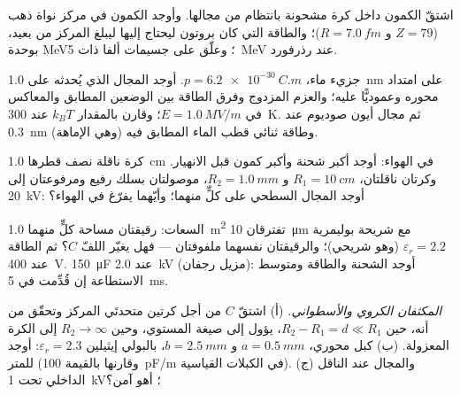 \begin{exercise}[$\star\star$]\label{exo:b1:potential-capacitors:6}
اشتقّ الكمون داخل كرة مشحونة بانتظام من مجالها.
وأوجد الكمون في مركز نواة ذهب ($Z = 79$ و $R = \qty{7.0}{fm}$)؛
والطاقة التي كان بروتون ليحتاج إليها ليبلغ المركز من بعيد،
بوحدة \unit{MeV}؛ وعلّق على جسيمات ألفا ذات \qty{5}{MeV} عند رذرفورد.
\end{exercise}

\begin{exercise}[$\star\star$]\label{exo:b1:potential-capacitors:7}
جزيء ماء، $p = \qty{6.2e-30}{C.m}$. أوجد المجال الذي يُحدثه على \qty{1.0}{nm}
على امتداد محوره وعموديًّا عليه؛ والعزم المزدوج وفرق الطاقة
بين الوضعين المطابق والمعاكس في $E = \qty{1.0}{MV/m}$؛
وقارن بالمقدار $k_BT$ عند \qty{300}{K}. ثم مجال أيون صوديوم عند
\qty{0.3}{nm} وطاقة ثنائي قطب الماء المطابق فيه (وهي الإماهة).
\end{exercise}

\begin{exercise}[$\star\star$]\label{exo:b1:potential-capacitors:8}
كرة ناقلة نصف قطرها \qty{1.0}{cm} في الهواء: أوجد أكبر شحنة
وأكبر كمون قبل الانهيار. وكرتان ناقلتان، $R_1 = \qty{10}{cm}$
و $R_2 = \qty{1.0}{mm}$، موصولتان بسلك رفيع ومرفوعتان إلى
\qty{20}{kV}: أوجد المجال السطحي على كلٍّ منهما؛ وأيّهما يفرّغ في الهواء؟
\end{exercise}

\begin{exercise}[$\star\star$]\label{exo:b1:potential-capacitors:9}
السعات: رقيقتان مساحة كلٍّ منهما \qty{1.0}{m^2} تفترقان \qty{10}{\micro m} مع
شريحة بوليمرية $\varepsilon_r = 2.2$ (وهو  شريحي)؛ والرقيقتان نفسهما ملفوفتان
--- فهل يغيّر اللفّ $C$؟ ثم الطاقة عند \qty{400}{V}.  \qty{150}{\micro F}
عند \qty{2.0}{kV} (مزيل رجفان): أوجد الشحنة والطاقة ومتوسط الاستطاعة إن
قُدِّمت في \qty{5}{ms}.
\end{exercise}

\begin{exercise}[$\star\star\star$]\label{exo:b1:potential-capacitors:10}
\emph{المكثفان الكروي والأسطواني.} (أ) اشتقّ $C$ من أجل
كرتين متحدتَي المركز وتحقّق من أنه، حين $R_2 - R_1 = d \ll R_1$، يؤول
إلى صيغة المستوي، وحين $R_2 \to \infty$ إلى الكرة المعزولة.
(ب) كبل محوري، $a = \qty{0.5}{mm}$ و $b = \qty{2.5}{mm}$، بالبولي إيثيلين
$\varepsilon_r = 2.3$: أوجد  للمتر (وقارنها بالقيمة \qty{100}{pF/m}
في الكبلات القياسية). (ج) والمجال عند الناقل الداخلي تحت
\qty{1}{kV}؛ أهو آمن؟
\end{exercise}

